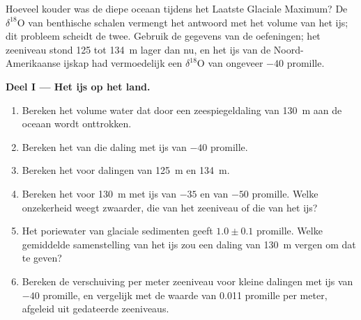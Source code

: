 \begin{problem}\label{pb:b2:climate-proxies:1}
Hoeveel kouder was de diepe oceaan tijdens het Laatste Glaciale Maximum? De $\delta^{18}$O van benthische schalen
vermengt het antwoord met het volume van het ijs; dit probleem scheidt de twee. Gebruik de gegevens van de
oefeningen; het zeeniveau stond 125 tot \qty{134}{m} lager dan nu, en het ijs van de Noord-Amerikaanse
ijskap had vermoedelijk een $\delta^{18}$O van ongeveer $-40$ promille.

\medskip\noindent\textbf{Deel I --- Het ijs op het land.}
\begin{enumerate}
  \item Bereken het volume water dat door een zeespiegeldaling van \qty{130}{m} aan de oceaan wordt onttrokken.
  \item Bereken het  van die daling met ijs van $-40$ promille.
  \item Bereken het voor dalingen van \qty{125}{m} en \qty{134}{m}.
  \item Bereken het voor \qty{130}{m} met ijs van $-35$ en van $-50$ promille. Welke onzekerheid
        weegt zwaarder, die van het zeeniveau of die van het ijs?
  \item Het poriewater van glaciale sedimenten geeft $1.0 \pm 0.1$ promille. Welke gemiddelde samenstelling
        van het ijs zou een daling van \qty{130}{m} vergen om dat te geven?
  \item Bereken de verschuiving per meter zeeniveau voor kleine dalingen met ijs van $-40$ promille, en
        vergelijk met de waarde van \num{0.011} promille per meter, afgeleid uit gedateerde zeeniveaus.
\end{enumerate}


\end{problem}
